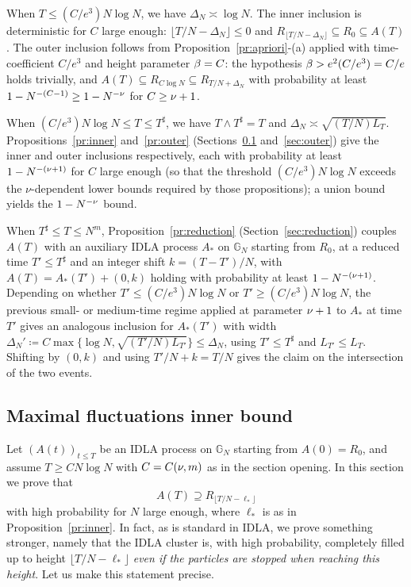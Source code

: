 \documentclass[11pt,a4paper,reqno]{amsart}
\theoremstyle{definition}
\newcommand{\bbG}{{\ensuremath{\mathbb G}} }
\begin{document}
When $T \leq (C/e^3) N \log N$, we have $\Delta_N \asymp \log N$. The inner inclusion is deterministic for $C$ large enough: $\lfloor T/N - \Delta_N\rfloor \leq 0$ and $R_{\lfloor T/N - \Delta_N\rfloor} \subseteq R_0 \subseteq A(T)$. The outer inclusion follows from Proposition~\ref{pr:apriori}-(a) applied with time-coefficient $C/e^3$ and height parameter $\beta = C$: the hypothesis $\beta > e^2 (C/e^3) = C/e$ holds trivially, and $A(T) \subseteq R_{C \log N} \subseteq R_{T/N + \Delta_N}$ with probability at least $1 - N^{-(C-1)} \geq 1 - N^{-\nu}$ for $C \geq \nu + 1$.

When $(C/e^3) N \log N \leq T \leq T^\sharp$, we have $T \wedge T^\sharp = T$ and $\Delta_N \asymp \sqrt{(T/N) L_T}$. Propositions~\ref{pr:inner} and~\ref{pr:outer} (Sections~\ref{sec:inner} and~\ref{sec:outer}) give the inner and outer inclusions respectively, each with probability at least $1 - N^{-(\nu+1)}$ for $C$ large enough (so that the threshold $(C/e^3) N\log N$ exceeds the $\nu$-dependent lower bounds required by those propositions); a union bound yields the $1 - N^{-\nu}$ bound.

When $T^\sharp \leq T \leq N^m$, Proposition~\ref{pr:reduction} (Section~\ref{sec:reduction}) couples $A(T)$ with an auxiliary IDLA process $A_*$ on $\bbG_N$ starting from $R_0$, at a reduced time $T' \leq T^\sharp$ and an integer shift $k = (T - T')/N$, with $A(T) = A_*(T') + (0, k)$ holding with probability at least $1 - N^{-(\nu+1)}$. Depending on whether $T' \leq (C/e^3) N\log N$ or $T' \geq (C/e^3) N\log N$, the previous small- or medium-time regime applied at parameter $\nu + 1$ to $A_*$ at time $T'$ gives an analogous inclusion for $A_*(T')$ with width $\Delta_N' \coloneqq C \max\{\log N, \sqrt{(T'/N) L_{T'}}\} \leq \Delta_N$, using $T' \leq T^\sharp$ and $L_{T'} \leq L_T$. Shifting by $(0, k)$ and using $T'/N + k = T/N$ gives the claim on the intersection of the two events.


\subsection{Maximal fluctuations inner bound} \label{sec:inner}
Let $(A(t))_{t\leq T}$ be an IDLA process on $\bbG_N$ starting from $A(0) = R_0$, and assume $T \geq C N\log N$ with $C = C(\nu, m)$ as in the section opening.
In this section we prove that
	\[ A(T) \supseteq R_{\lfloor T/N - \ell_*\rfloor} \]
with high probability for $N$ large enough, where $\ell_*$ is as in Proposition~\ref{pr:inner}.
In fact, as is standard in IDLA, we prove something stronger, namely that the IDLA cluster is, with high probability, completely filled up to height $\lfloor T/N - \ell_*\rfloor$ \emph{even if the particles are stopped when reaching this height}. Let us make this statement precise.
\end{document}

